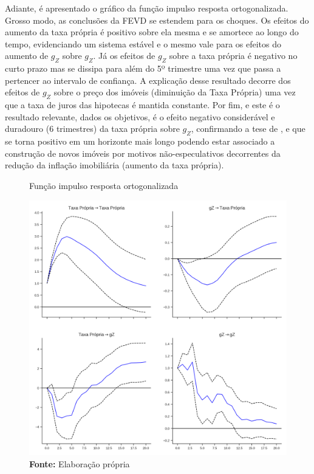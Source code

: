 Adiante, é apresentado o gráfico da função impulso resposta ortogonalizada. Grosso modo, as conclusões da FEVD se estendem para os choques. Os efeitos do aumento da taxa própria é positivo sobre ela mesma e se amortece ao longo do tempo, evidenciando um sistema estável e o mesmo vale para os efeitos do aumento de $g_Z$ sobre $g_Z$. Já os efeitos de $g_Z$ sobre a taxa própria é negativo no curto prazo mas se dissipa para além do 5º trimestre uma vez que passa a pertencer ao intervalo de confiança. A explicação desse resultado decorre dos efeitos de $g_Z$ sobre o preço dos imóveis (diminuição da Taxa Própria) uma vez que a taxa de juros das hipotecas é mantida constante. Por fim, e este é o resultado relevante, dados os objetivos, é o efeito negativo considerável e duradouro (6 trimestres) da taxa própria sobre $g_Z$, confirmando a tese de \textcite{teixeira_crescimento_2015}, e que se torna positivo em um horizonte mais longo podendo estar associado a construção de novos imóveis por motivos não-especulativos decorrentes da redução da inflação imobiliária (aumento da taxa própria).


\begin{figure}[htb]
	\centering
	\caption{Função impulso resposta ortogonalizada}
	\label{fevd}
	\includegraphics[width=\textwidth]{Fatos_Estilizados/Figs/Impulso_VECM.png}
	\caption*{\textbf{Fonte:} Elaboração própria}
\end{figure}

